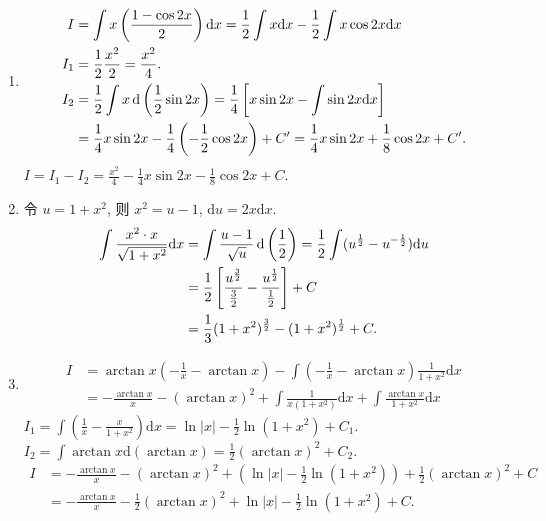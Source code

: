 \begin{solution}
\begin{enumerate}
        \item \begin{align*}
                  I   & = \int x \left(\frac{1 - \cos 2x}{2}\right) \mathrm{d}x = \frac{1}{2} \int x \mathrm{d}x - \frac{1}{2} \int x \cos 2x \mathrm{d}x \\
                  I_1 & = \frac{1}{2} \frac{x^2}{2} = \frac{x^2}{4}.                                                                                      \\
                  I_2 & = \frac{1}{2} \int x \operatorname{d}\left(\frac{1}{2} \sin 2x\right) = \frac{1}{4} \left[ x \sin 2x - \int \sin 2x \mathrm{d}x \right]      \\
                      & = \frac{1}{4} x \sin 2x - \frac{1}{4} \left(-\frac{1}{2} \cos 2x\right) + C' = \frac{1}{4} x \sin 2x + \frac{1}{8} \cos 2x + C'.
              \end{align*}
              $I = I_1 - I_2 = \frac{x^2}{4} - \frac{1}{4} x \sin 2x - \frac{1}{8} \cos 2x + C$.

        \item 令 $u = 1 + x^2$, 则 $x^2 = u - 1$, $\mathrm{d}u = 2x \mathrm{d}x$.
              \begin{align*}
                  \int \frac{x^2 \cdot x}{\sqrt{1 + x^2}} \mathrm{d}x & = \int \frac{u - 1}{\sqrt{u}} \operatorname{d}\left(\frac{1}{2}\right) = \frac{1}{2} \int (u^{\frac{1}{2}} - u^{-\frac{1}{2}}) \mathrm{d}u \\
                                                                      & = \frac{1}{2} \left[ \frac{u^{\frac{3}{2}}}{\frac{3}{2}} - \frac{u^{\frac{1}{2}}}{\frac{1}{2}} \right] + C                      \\
                                                                      & = \frac{1}{3} (1 + x^2)^{\frac{3}{2}} - (1 + x^2)^{\frac{1}{2}} + C.
              \end{align*}

        \item \begin{align*}
                  I & = \arctan x \left(-\frac{1}{x} - \arctan x\right) - \int \left(-\frac{1}{x} - \arctan x\right) \frac{1}{1 + x^2} \mathrm{d}x \\
                    & = -\frac{\arctan x}{x} - (\arctan x)^2 + \int \frac{1}{x(1 + x^2)} \mathrm{d}x + \int \frac{\arctan x}{1 + x^2} \mathrm{d}x
              \end{align*}
              $I_1 = \int \left(\frac{1}{x} - \frac{x}{1 + x^2}\right) \mathrm{d}x = \ln|x| - \frac{1}{2} \ln(1 + x^2) + C_1$.
              $I_2 = \int \arctan x \mathrm{d}(\arctan x) = \frac{1}{2} (\arctan x)^2 + C_2$.
              \begin{align*}
                  I & = -\frac{\arctan x}{x} - (\arctan x)^2 + \left(\ln|x| - \frac{1}{2} \ln(1 + x^2)\right) + \frac{1}{2} (\arctan x)^2 + C \\
                    & = -\frac{\arctan x}{x} - \frac{1}{2} (\arctan x)^2 + \ln|x| - \frac{1}{2} \ln(1 + x^2) + C.
              \end{align*}


\end{enumerate}
\end{solution}
